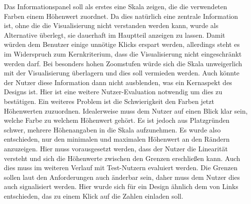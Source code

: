 Das Informationspanel soll als erstes eine Skala zeigen, die die verwendeten Farben einem Höhenwert zuordnet. Da dies natürlich eine zentrale Information ist, ohne die die Visualisierung nicht verstanden werden kann, wurde als Alternative überlegt, sie dauerhaft im Hauptteil anzeigen zu lassen. Damit würden dem Benutzer einige unnötige Klicks erspart werden, allerdings steht es im Widerspruch zum Kernkriterium, dass die Visualisierung nicht eingeschränkt werden darf. Bei besonders hohen Zoomstufen würde sich die Skala unweigerlich mit der Visualisierung überlagern und dies soll vermieden werden. Auch könnte der Nutzer diese Information dann nicht ausblenden, was ein Kernaspekt des Designs ist. Hier ist eine weitere Nutzer-Evaluation notwendig um dies zu bestätigen. Ein weiteres Problem ist die Schwierigkeit den Farben jetzt Höhenwerten zuzuordnen. Idealerweise muss dem Nutzer auf einen Blick klar sein, welche Farbe zu welchem Höhenwert gehört. Es ist jedoch aus Platzgründen schwer, mehrere Höhenangaben in die Skala aufzunehmen. Es wurde also entschieden, nur den minimalen und maximalen Höhenwert an den Rändern anzuzeigen. Hier muss vorausgesetzt werden, dass der Nutzer die Linearität versteht und sich die Höhenwerte zwischen den Grenzen erschließen kann. Auch dies muss im weiteren Verlauf mit Test-Nutzern evaluiert werden. Die Grenzen sollen laut den Anforderungen auch änderbar sein, daher muss dem Nutzer dies auch signalisiert werden. Hier wurde sich für ein Design ähnlich dem von Links entschieden, das zu einem Klick auf die Zahlen einladen soll.

